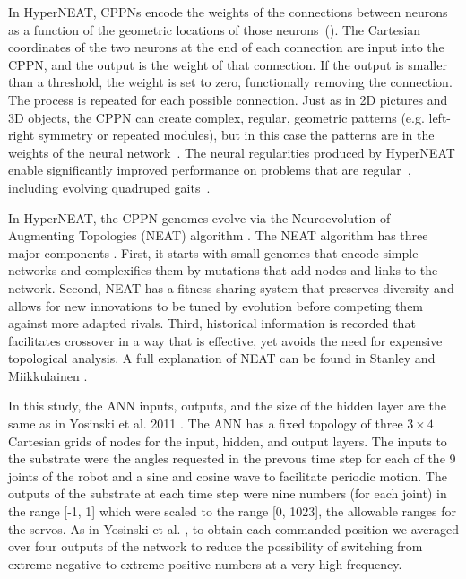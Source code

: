 In HyperNEAT, CPPNs encode the weights of the connections between neurons as a function of the geometric locations of those neurons~(). The Cartesian coordinates of the two neurons at the end of each connection are input into the CPPN, and the output is the weight of that connection. If the output is smaller than a threshold, the weight is set to zero, functionally removing the connection. The process is repeated for each possible connection. Just as in 2D pictures and 3D objects, the CPPN can create complex, regular, geometric patterns (e.g. left-right symmetry or repeated modules), but in this case the patterns are in the weights of the neural network~\cite{clune2011performance, }. The neural regularities produced by HyperNEAT enable significantly improved performance on problems that are regular~\cite{clune2011performance, stanley2009hypercube}, including evolving quadruped gaits~\cite{clune2011performance, clune2009evolving, clune2009sensitivity}. 

In HyperNEAT, the CPPN genomes evolve via the Neuroevolution of Augmenting Topologies (NEAT) algorithm \cite{stanley2006exploiting}. 
The NEAT algorithm has three major components \cite{stanley2006exploiting}. 
First, it starts with small genomes that encode simple networks and complexifies them by mutations that add nodes and links to the network. Second, NEAT has a fitness-sharing system that preserves diversity and allows for new innovations to be tuned by evolution before competing them against more adapted rivals. 
Third, historical information is recorded that facilitates crossover in a way that is effective, yet avoids the need for expensive topological analysis. A full explanation of NEAT can be found in Stanley and Miikkulainen \cite{stanley2006exploiting}. 

In this study, the ANN inputs, outputs, and the size of the hidden layer are the same as in Yosinski et al. 2011 \cite{yos:clune}. 
The ANN has a fixed topology of three \begin{math}3\times4\end{math} Cartesian grids of nodes for the input, hidden, and output layers. 
The inputs to the substrate were the angles requested in the prevous time step for each of the 9 joints of the robot and a sine and cosine wave to facilitate periodic motion. 
The outputs of the substrate at each time step were nine numbers (for each joint) in the range [-1, 1] which were scaled to the range [0, 1023], the allowable ranges for the servos. 
As in Yosinski et al. \cite{yos:clune}, to obtain each commanded position we averaged over four outputs of the network to reduce the possibility of switching from extreme negative to extreme positive numbers at a very high frequency. 

